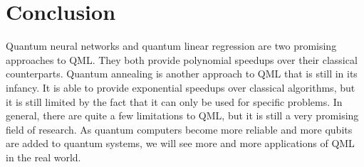 \documentclass[12pt]{article}
\begin{document}
\section*{Conclusion}
Quantum neural networks and quantum linear regression are two promising approaches to QML. They both provide polynomial speedups over their classical counterparts. Quantum annealing is another approach to QML that is still in its infancy. It is able to provide exponential speedups over classical algorithms, but it is still limited by the fact that it can only be used for specific problems. In general, there are quite a few limitations to QML, but it is still a very promising field of research. As quantum computers become more reliable and more qubits are added to quantum systems, we will see more and more applications of QML in the real world.

\end{document}
